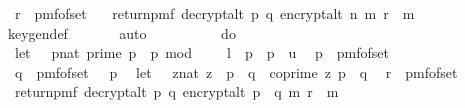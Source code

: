\begin{isabellebody}
\ \ r\ {\isasymleftarrow}\ pmf{\isacharunderscore}{\kern0pt}of{\isacharunderscore}{\kern0pt}set\ {\isasymZ}{\isacharsemicolon}{\kern0pt}\isanewline
\ \ return{\isacharunderscore}{\kern0pt}pmf\ {\isacharparenleft}{\kern0pt}decrypt{\isacharunderscore}{\kern0pt}alt\ p\ q\ {\isacharparenleft}{\kern0pt}encrypt{\isacharunderscore}{\kern0pt}alt\ n\ m\ r{\isacharparenright}{\kern0pt}\ {\isacharequal}{\kern0pt}\ m{\isacharparenright}{\kern0pt}{\isacharbraceright}{\kern0pt}{\isachardoublequoteclose}\ \isanewline
\ \ \ \ \isamarkupfalse%
\ key{\isacharunderscore}{\kern0pt}gen{\isacharunderscore}{\kern0pt}def\ \isanewline
\ \ \ \ \isamarkupfalse%
\ auto\isanewline
\isanewline
\ \isamarkupfalse%
\ \isamarkupfalse%
\ {\isachardoublequoteopen}{\isachardot}{\kern0pt}{\isachardot}{\kern0pt}{\isachardot}{\kern0pt}\ {\isacharequal}{\kern0pt}\ \isanewline
\ \ \ do\ {\isacharbraceleft}{\kern0pt}\isanewline
\ \ let\ {\isasymK}\ {\isacharequal}{\kern0pt}\ {\isacharbraceleft}{\kern0pt}{\isacharparenleft}{\kern0pt}p{\isacharcolon}{\kern0pt}{\isacharcolon}{\kern0pt}nat{\isacharparenright}{\kern0pt}{\isachardot}{\kern0pt}\ prime\ p\ {\isasymand}\ p\ mod\ {}\ {\isacharequal}{\kern0pt}\ {}\ {\isasymand}\ l\ {\isasymle}\ p\ {\isasymand}\ p\ {\isasymle}\ u{\isacharbraceright}{\kern0pt}{\isacharsemicolon}{\kern0pt}\isanewline
\ \ p\ {\isasymleftarrow}\ pmf{\isacharunderscore}{\kern0pt}of{\isacharunderscore}{\kern0pt}set\ {\isasymK}{\isacharsemicolon}{\kern0pt}\ \isanewline
\ \ q\ {\isasymleftarrow}\ pmf{\isacharunderscore}{\kern0pt}of{\isacharunderscore}{\kern0pt}set\ {\isacharparenleft}{\kern0pt}{\isasymK}\ {\isacharminus}{\kern0pt}\ {\isacharbraceleft}{\kern0pt}p{\isacharbraceright}{\kern0pt}{\isacharparenright}{\kern0pt}{\isacharsemicolon}{\kern0pt}\isanewline
\ \ let\ {\isasymZ}\ {\isacharequal}{\kern0pt}\ {\isacharbraceleft}{\kern0pt}{\isacharparenleft}{\kern0pt}z{\isacharcolon}{\kern0pt}{\isacharcolon}{\kern0pt}nat{\isacharparenright}{\kern0pt}{\isachardot}{\kern0pt}\ z\ {\isacharless}{\kern0pt}\ p\ {\isacharasterisk}{\kern0pt}\ q\ {\isasymand}\ coprime\ z\ {\isacharparenleft}{\kern0pt}p\ {\isacharasterisk}{\kern0pt}\ q{\isacharparenright}{\kern0pt}{\isacharbraceright}{\kern0pt}{\isacharsemicolon}{\kern0pt}\isanewline
\ \ r\ {\isasymleftarrow}\ pmf{\isacharunderscore}{\kern0pt}of{\isacharunderscore}{\kern0pt}set\ {\isasymZ}{\isacharsemicolon}{\kern0pt}\isanewline
\ \ return{\isacharunderscore}{\kern0pt}pmf\ {\isacharparenleft}{\kern0pt}decrypt{\isacharunderscore}{\kern0pt}alt\ p\ q\ {\isacharparenleft}{\kern0pt}encrypt{\isacharunderscore}{\kern0pt}alt\ {\isacharparenleft}{\kern0pt}p\ {\isacharasterisk}{\kern0pt}\ q{\isacharparenright}{\kern0pt}\ m\ r{\isacharparenright}{\kern0pt}\ {\isacharequal}{\kern0pt}\ m{\isacharparenright}{\kern0pt}{\isacharbraceright}{\kern0pt}{\isachardoublequoteclose}\ \isanewline

\end{isabellebody}
